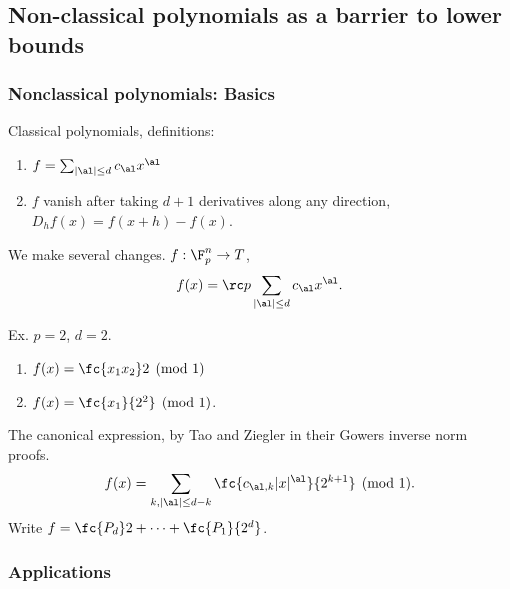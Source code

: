 \subsection{Non-classical polynomials as a barrier to lower bounds}


\subsubsection{Nonclassical polynomials: Basics}

Classical polynomials, definitions:
\begin{enumerate}
\item
$f=\sum_{|\al|\le d}c_\al x^\al$
\item 
$f$ vanish after taking $d+1$ derivatives along any direction, $D_hf(x) = f(x+h)-f(x)$.
\end{enumerate}
We make several changes. $f:\F_p^n\to T$,
\[
f(x)=\rc p\sum_{|\al|\le d}c_\al x^\al.
\]

Ex. $p=2$, $d=2$.
\begin{enumerate}
\item
$f(x)=\fc{x_1x_2}2\pmod 1$
\item
$f(x)=\fc{x_1}{2^2}\pmod 1$.
\end{enumerate}
The canonical expression, by Tao and Ziegler in their Gowers inverse norm proofs.
\[
f(x) = \sum_{k,|\al|\le d-k} \fc{c_{\al,k}|x|^{\al}}{2^{k+1}}\pmod 1.
\]
Write $f=\fc{P_d}2+\cdots + \fc{P_1}{2^d}$.


\subsubsection{Applications}

